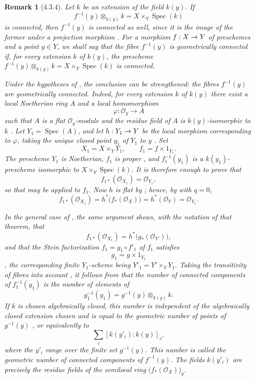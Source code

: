 \documentclass[oneside]{amsart}
\theoremstyle{ega-env-style}
\theoremstyle{ega-thm-env-style}
\theoremstyle{ega-defn-env-style}
\newtheorem*{remark}{Remark}
\def\mathcal{\mathscr}
\def\sh{\mathcal}                   %
\def\kres{k}                        %
\def\Spec{\operatorname{Spec}}
\renewcommand{\to}{\mathchoice{\longrightarrow}{\rightarrow}{\rightarrow}{\rightarrow}}
\newcommand{\oldpage}[2][]{{\marginnote{\normalfont{\textbf{#1}~|~#2}}}\ignorespaces}
\let\EGAOriginalLabel\label
\renewcommand{\label}[1]{\phantomsection\EGAOriginalLabel{#1}}
\begin{document}
\begin{remark}[4.3.4]
\label{III.4.3.4}
Let $k$ be an extension of the field $\kres(y)$.  If
\[
  f^{-1}(y)\otimes_{\kres(y)}k
  =
  X\times_Y\Spec(k)
\]
is connected, then $f^{-1}(y)$ is connected as well, since it is the
image of the former under a projection morphism
.  For a morphism $f:X\to Y$ of preschemes and a
point $y\in Y$, we shall say that the fibre $f^{-1}(y)$ is
\emph{geometrically connected} if, for every extension $k$ of
$\kres(y)$, the prescheme
$f^{-1}(y)\otimes_{\kres(y)}k=X\times_Y\Spec(k)$ is connected.

\oldpage[III]{132}

Under the hypotheses of , the conclusion can be
strengthened: the fibres $f^{-1}(y)$ are geometrically connected.
Indeed, for every extension $k$ of $\kres(y)$ there exist a local
Noetherian ring $A$ and a local homomorphism
\[
  \varphi:\sh{O}_y\longrightarrow A
\]
such that $A$ is a flat $\sh{O}_y$-module and the residue field of
$A$ is $\kres(y)$-isomorphic to $k$ .
Let $Y_1=\Spec(A)$, and let $h:Y_1\to Y$ be the local morphism
corresponding to $\varphi$, taking the unique closed point $y_1$ of
$Y_1$ to $y$ .  Set
\[
  X_1=X\times_Y Y_1,
  \qquad
  f_1=f\times 1_{Y_1}.
\]
The prescheme $Y_1$ is Noetherian, $f_1$ is proper
, and $f_1^{-1}(y_1)$ is a
$\kres(y_1)$-prescheme isomorphic to $X\times_Y\Spec(k)$.  It is
therefore enough to prove that
\[
  f_{1*}(\sh{O}_{X_1})=\sh{O}_{Y_1},
\]
so that  may be applied to $f_1$.  Now $h$ is flat
by ; hence, by  with $q=0$,
\[
  f_{1*}(\sh{O}_{X_1})
  =
  h^*\bigl(f_*(\sh{O}_X)\bigr)
  =
  h^*(\sh{O}_Y)
  =
  \sh{O}_{Y_1}.
\]

In the general case of , the same argument shows,
with the notation of that theorem, that
\[
  f_{1*}(\sh{O}_{X_1})
  =
  h^*\bigl(g_*(\sh{O}_{Y'})\bigr),
\]
and that the Stein factorization $f_1=g_1\circ f'_1$ of $f_1$
satisfies
\[
  g_1=g\times 1_{Y_1}
\]
, the corresponding finite $Y_1$-scheme being
$Y'_1=Y'\times_Y Y_1$.  Taking the transitivity of fibres into
account , it follows from
 that the number of connected components of
$f_1^{-1}(y_1)$ is the number of elements of
\[
  g_1^{-1}(y_1)
  =
  g^{-1}(y)\otimes_{\kres(y)}k.
\]
If $k$ is chosen algebraically closed, this number is independent of
the algebraically closed extension chosen and is equal to the
\emph{geometric number of points} of $g^{-1}(y)$
, or equivalently to
\[
  \sum_i[\kres(y'_i):\kres(y)]_s,
\]
where the $y'_i$ range over the finite set $g^{-1}(y)$.  This number
is called the \emph{geometric number of connected components} of
$f^{-1}(y)$.  The fields $\kres(y'_i)$ are precisely the residue
fields of the semilocal ring $\bigl(f_*(\sh{O}_X)\bigr)_y$.
\end{remark}
\end{document}
